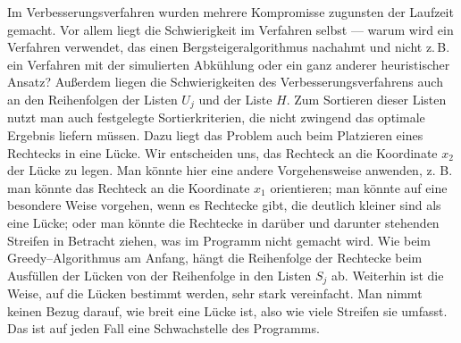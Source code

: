 Im Verbesserungsverfahren wurden mehrere Kompromisse zugunsten der Laufzeit gemacht.
Vor allem liegt die Schwierigkeit im Verfahren selbst --- warum wird ein Verfahren verwendet, das
einen Bergsteigeralgorithmus nachahmt 
und nicht z.\,B. ein Verfahren mit der simulierten Abkühlung oder ein ganz anderer heuristischer Ansatz?
Außerdem liegen die Schwierigkeiten des Verbesserungsverfahrens auch an
den Reihenfolgen der Listen $U_j$ und der Liste $H$.
Zum Sortieren dieser Listen nutzt man auch festgelegte Sortierkriterien,
die nicht zwingend das optimale Ergebnis liefern müssen.
Dazu liegt das Problem auch beim Platzieren eines Rechtecks in eine Lücke. 
Wir entscheiden uns, das Rechteck an die Koordinate $x_2$ der Lücke zu legen.
Man könnte hier eine andere Vorgehensweise anwenden, z. B. man könnte das
Rechteck an die Koordinate $x_1$ orientieren; man könnte auf eine besondere
Weise vorgehen, wenn es Rechtecke gibt, die deutlich kleiner sind als eine Lücke; oder
man könnte die Rechtecke in darüber und darunter stehenden Streifen in Betracht ziehen, 
was im Programm nicht gemacht wird.
Wie beim Greedy--Algorithmus am Anfang, hängt die Reihenfolge der Rechtecke 
beim Ausfüllen der Lücken von der Reihenfolge in den Listen $S_j$ ab. 
Weiterhin ist die Weise, auf die Lücken bestimmt werden, sehr stark vereinfacht. 
Man nimmt keinen Bezug darauf, wie breit eine Lücke ist, also wie viele Streifen sie umfasst.
Das ist auf jeden Fall eine Schwachstelle des Programms.